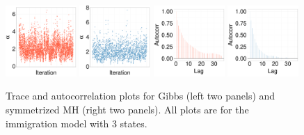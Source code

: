   \begin{figure}[H]
  \centering
  \begin{minipage}[!hp]{0.99\linewidth}
    \includegraphics [width=0.24\textwidth, angle=0]{figs/Q_ks/q_traceGBS_20_03_3_.pdf}
    \includegraphics [width=0.24\textwidth, angle=0]{figs/Q_ks/q_traceMH_20_03_3_.pdf}
    \includegraphics [width=0.24\textwidth, angle=0]{figs/Q_ks/q_gbsacf_20_03_3_.pdf}
    \includegraphics [width=0.24\textwidth, angle=0]{figs/Q_ks/q_mhacf_20_03_3_.pdf}
  \end{minipage}
  
\caption{Trace and autocorrelation plots for Gibbs (left two panels) and symmetrized MH (right two panels). All plots are for the immigration model with $3$ states.}
     \label{fig:TRACE_Q}
  \end{figure}
  

